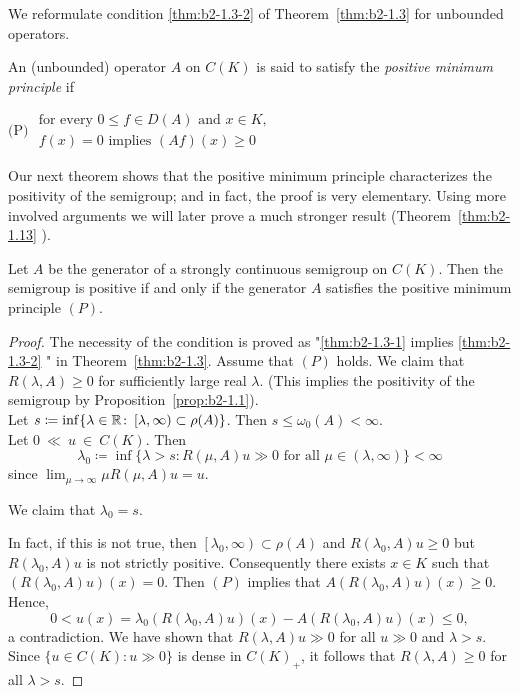 We reformulate condition \ref{thm:b2-1.3-2} of Theorem~\ref{thm:b2-1.3} for unbounded operators.

\begin{definition}\label{def:b2-1.5}
An (unbounded) operator $A$ on $C(K)$ is said to satisfy the \emph{positive minimum principle} if

$\text{(P)}$ \qquad $
\begin{array}{l}
	\text{for every } 0 \leq f \in D(A) \text{ and } x \in K,\\
    f(x) = 0 \text{ implies } (Af)(x) \geq 0
\end{array}$
\end{definition}
Our next theorem shows that the positive minimum principle characterizes the positivity of the semigroup; and in fact, the proof is very elementary.
Using more involved arguments we will later prove a much stronger result (Theorem~\ref{thm:b2-1.13} ).
\begin{theorem}\label{thm:b2-1.6}
Let $A$ be the generator of a strongly continuous semigroup on $C(K)$.
Then the semigroup is positive if and only if the generator $A$ satisfies the positive minimum principle $(P)$.
\end{theorem}
\begin{proof}
The necessity of the condition is proved as "\ref{thm:b2-1.3-1} implies \ref{thm:b2-1.3-2} " in Theorem~\ref{thm:b2-1.3}.
Assume that $(P)$ holds.
We claim that $R(\lambda,A) \geq 0$ for sufficiently large real $\lambda$. 
(This implies the positivity of the semigroup by Proposition~\ref{prop:b2-1.1}).
\\
Let $s \coloneqq \inf \{\lambda \in \mathbb{R} \colon \left[\lambda,\infty \right) \subset \rho(A)\}$.
Then $s \leq \omega_{0}(A) < \infty$.
\\
Let $0~\ll~u~\in~C(K)$.
Then 
\[
\lambda_{0} \coloneqq \inf \{\lambda > s \colon R(\mu,A)u \gg 0 \text{ for all } \mu \in (\lambda,\infty)\} < \infty
\]
since $\lim_{\mu \to \infty} \mu R(\mu,A)u = u$.

We claim that $\lambda_{0} = s$.

In fact, if this is not true, then $\left[\lambda_{0},\infty\right) \subset \rho(A)$ and $R(\lambda_{0},A)u \geq 0$ but $R(\lambda_{0},A)u$ is not strictly positive.
Consequently there exists $x \in K$ such that $(R(\lambda_{0},A)u)(x) = 0$.
Then $(P)$ implies that $A(R(\lambda_{0},A)u)(x) \geq 0$.
Hence, 
\[
0 < u(x) = \lambda_{0}(R(\lambda_{0},A)u)(x) - A(R(\lambda_{0},A)u)(x) \leq 0,
\]
a contradiction.
We have shown that $R(\lambda,A)u \gg 0$ for all $u \gg 0$ and $\lambda > s$.
Since $\{u \in C(K): u \gg 0\}$ is dense in $C(K)_{+}$, it follows that $R(\lambda,A) \geq 0$ for all $\lambda > s$.
\end{proof}

